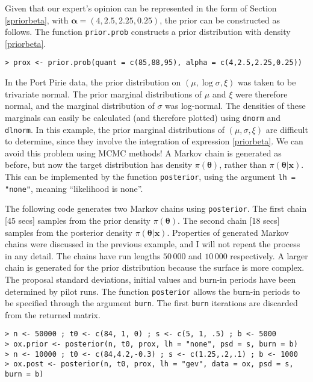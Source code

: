 \documentclass[11pt,a4paper]{article}
\newcommand{\bs}{\boldsymbol}
\begin{document}
Given that our expert's opinion can be represented in the form of Section \ref{spriorbeta}, with $\bs{\alpha} = (4,2.5,2.25,0.25)$, the prior can be constructed as follows.
The function \verb+prior.prob+ constructs a prior distribution with density \eqref{priorbeta}.

\begin{verbatim}
> prox <- prior.prob(quant = c(85,88,95), alpha = c(4,2.5,2.25,0.25))
\end{verbatim}

In the Port Pirie data, the prior distribution on $(\mu,\log \sigma,\xi)$ was taken to be trivariate normal.
The prior marginal distributions of $\mu$ and $\xi$ were therefore normal, and the marginal distribution of $\sigma$ was log-normal.
The densities of these marginals can easily be calculated (and therefore plotted) using \verb+dnorm+ and \verb+dlnorm+.
In this example, the prior marginal distributions of $(\mu,\sigma,\xi)$ are difficult to determine, since they involve the integration of expression \eqref{priorbeta}.
We can avoid this problem using MCMC methods!
A Markov chain is generated as before, but now the target distribution has density $\pi(\bs{\theta})$, rather than $\pi(\bs{\theta}|\bs{x})$.
This can be implemented by the function \verb+posterior+, using the argument \verb+lh = "none"+, meaning ``likelihood is none''.

The following code generates two Markov chains using \verb+posterior+.
The first chain [45 secs] samples from the prior density $\pi(\bs{\theta})$.
The second chain [18 secs] samples from the posterior density $\pi(\bs{\theta}|\bs{x})$. 
Properties of generated Markov chains were discussed in the previous example, and I will not repeat the process in any detail.
The chains have run lengths $50\,000$ and $10\,000$ respectively.
A larger chain is generated for the prior distribution because the surface is more complex.
The proposal standard deviations, initial values and burn-in periods have been determined by pilot runs.
The function \verb+posterior+ allows the burn-in periods to be specified through the argument \verb+burn+.
The first \verb+burn+ iterations are discarded from the returned matrix.

\begin{verbatim}
> n <- 50000 ; t0 <- c(84, 1, 0) ; s <- c(5, 1, .5) ; b <- 5000
> ox.prior <- posterior(n, t0, prox, lh = "none", psd = s, burn = b)
> n <- 10000 ; t0 <- c(84,4.2,-0.3) ; s <- c(1.25,.2,.1) ; b <- 1000
> ox.post <- posterior(n, t0, prox, lh = "gev", data = ox, psd = s, burn = b)
\end{verbatim}
\end{document}
